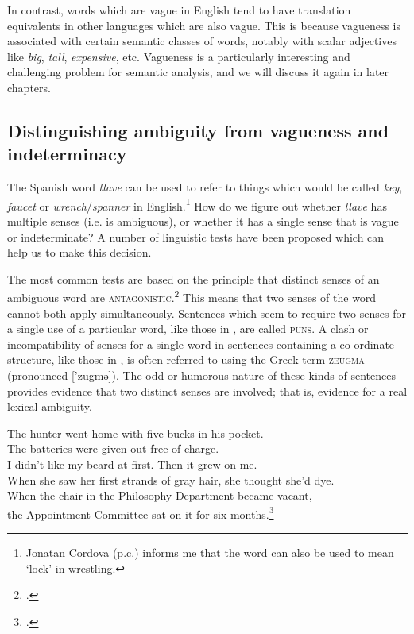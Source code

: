 In contrast, words which are vague in English tend to have translation equivalents in other languages which are also vague. This is because vagueness is associated with certain semantic classes of words, notably with scalar adjectives like \textit{big}, \textit{tall}, \textit{expensive}, etc. Vagueness is a particularly interesting and challenging problem for semantic analysis, and we will discuss it again in later chapters.


\subsection{Distinguishing ambiguity from vagueness and indeterminacy}\label{sec:5.3.2}

The Spanish word \textit{llave} can be used to refer to things which would be called \textit{key}, \textit{faucet} or \textit{wrench}/\textit{spanner} in English.\footnote{Jonatan Cordova (p.c.) informs me that the word can also be used to mean ‘lock’ in wrestling.} How do we figure out whether \textit{llave} has multiple senses (i.e. is ambiguous), or whether it has a single sense that is vague or indeterminate? A number of linguistic tests have been proposed which can help us to make this decision. 



The most common tests are based on the principle that distinct senses of an ambiguous word are \textsc{antagonistic}.\footnote{\citet[61]{Cruse1986}.} This means that two senses of the word cannot both apply simultaneously. Sentences which seem to require two senses for a single use of a particular word, like those in , are called \textsc{puns}. A clash or incompatibility of senses for a single word in sentences containing a co-ordinate structure, like those in , is often referred to using the Greek term \textsc{zeugma} (pronounced ['zugmə]). The odd or humorous nature of these kinds of sentences provides evidence that two distinct senses are involved; that is, evidence for a real lexical ambiguity.


\ea \label{ex:5.4}
\ea The hunter went home with five bucks in his pocket.\\
\ex The batteries were given out free of charge.\\
\ex I didn’t like my beard at first. Then it grew on me.\\
\ex When she saw her first strands of gray hair, she thought she’d dye.\\
\ex When the chair in the Philosophy Department became vacant,\\
  the Appointment Committee sat on it for six months.\footnote{\citet[108]{Cruse2000}.}
                       \z
\z


